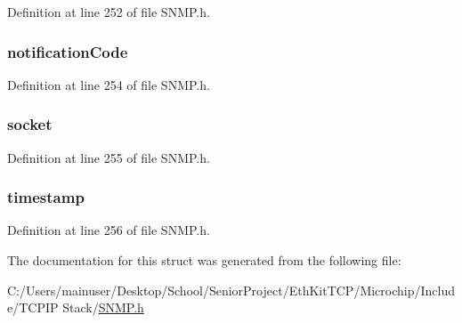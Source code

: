 Definition at line 252 of file S\+N\+M\+P.\+h.

\hypertarget{struct_s_n_m_p___n_o_t_i_f_y___i_n_f_o_a244447a4430cff9f7a52cbed7f022680}{}
\subsubsection[{notification\+Code}]{ notification\+Code}\label{struct_s_n_m_p___n_o_t_i_f_y___i_n_f_o_a244447a4430cff9f7a52cbed7f022680}


Definition at line 254 of file S\+N\+M\+P.\+h.

\hypertarget{struct_s_n_m_p___n_o_t_i_f_y___i_n_f_o_a55e70c01256c8243f8acce2fb4d53e23}{}
\subsubsection[{socket}]{ socket}\label{struct_s_n_m_p___n_o_t_i_f_y___i_n_f_o_a55e70c01256c8243f8acce2fb4d53e23}


Definition at line 255 of file S\+N\+M\+P.\+h.

\hypertarget{struct_s_n_m_p___n_o_t_i_f_y___i_n_f_o_aef48592763d178f6eb33bee0e7e9512d}{}
\subsubsection[{timestamp}]{ timestamp}\label{struct_s_n_m_p___n_o_t_i_f_y___i_n_f_o_aef48592763d178f6eb33bee0e7e9512d}


Definition at line 256 of file S\+N\+M\+P.\+h.



The documentation for this struct was generated from the following file\+:\begin{DoxyCompactItemize}
\item 
C\+:/\+Users/mainuser/\+Desktop/\+School/\+Senior\+Project/\+Eth\+Kit\+T\+C\+P/\+Microchip/\+Include/\+T\+C\+P\+I\+P Stack/\hyperlink{_s_n_m_p_8h}{S\+N\+M\+P.\+h}\end{DoxyCompactItemize}
